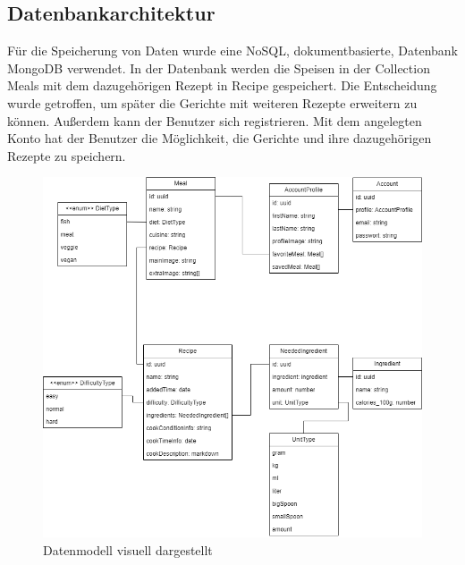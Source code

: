 \documentclass[conference,a4paper,flushend]{cs-techrep}
\begin{document}
\subsection{Datenbankarchitektur}
Für die Speicherung von Daten wurde eine NoSQL, dokumentbasierte, Datenbank MongoDB verwendet. In der Datenbank werden die Speisen in der Collection Meals mit dem dazugehörigen Rezept in Recipe gespeichert. Die Entscheidung wurde getroffen, um später die Gerichte mit weiteren Rezepte erweitern zu können. Außerdem kann der Benutzer sich registrieren. Mit dem angelegten Konto hat der Benutzer die Möglichkeit, die Gerichte und ihre dazugehörigen Rezepte zu speichern.
\begin{figure}[h]
    \centering
    \includegraphics[width=1\linewidth]{datamodell.png}
    \caption{Datenmodell visuell dargestellt}
    \label{fig:enter-label}
\end{figure}
\end{document}
